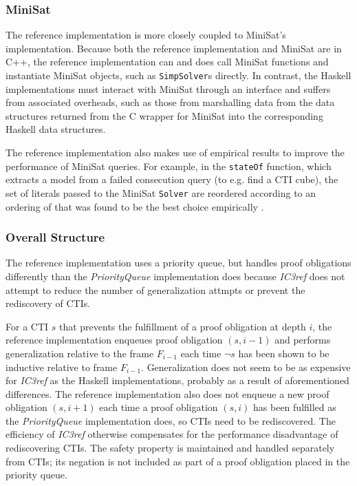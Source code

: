 \documentclass[12pt,a4paper,twoside,openright]{report}
\begin{document}
{\subsubsection{MiniSat}
The reference implementation is more closely coupled to MiniSat's implementation. Because both the reference
implementation and MiniSat are in C++, the reference implementation can and does call MiniSat functions
and instantiate MiniSat objects, such as \verb,SimpSolver,s directly.
In contrast, the Haskell implementations
must interact with MiniSat through an interface and suffers from associated overheads, such as those from
marshalling data from the data structures returned from the C wrapper for MiniSat into the corresponding
Haskell data structures.

The reference implementation also makes use of empirical results to improve the performance of MiniSat queries.
For example, in the \verb,stateOf, function, which extracts a model from a failed consecution query
(to e.g. find a CTI cube), the set of literals passed to the MiniSat \verb,Solver, are reordered according
to an ordering of that was found to be the best choice empirically \cite{minisat}.

\subsubsection{Overall Structure}

The reference implementation uses a priority queue, but handles proof obligations
differently than the {\it PriorityQueue} implementation does because \emph{IC3ref}
does not attempt to reduce the number of generalization attmpts or prevent
the rediscovery of CTIs.

For a CTI $s$ that prevents the fulfillment
of a proof obligation at depth $i$, the reference implementation enqueues proof
obligation $(s,i - 1)$
and performs generalization relative to the frame $F_{i - 1}$ each time $\neg s$ has been shown
to be inductive relative to frame $F_{i - 1}$. Generalization does not seem
to be as expensive for \emph{IC3ref} as the Haskell implementations, probably as a
result of aforementioned differences.
The reference implementation also does not
enqueue a new proof obligation $(s, i+1)$ each time a proof obligation $(s, i)$ has been
fulfilled as the \emph{PriorityQueue} implementation does,
so CTIs need to be rediscovered. The efficiency of \emph{IC3ref} otherwise compensates
for the performance disadvantage of rediscovering CTIs.
The safety property is maintained and
handled separately from CTIs; its negation is not included as part of a proof obligation
placed in the priority queue.

}
\end{document}
